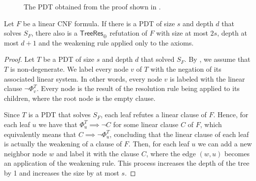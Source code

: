 \begin{figure}[H]
    \centering


    \caption{The PDT obtained from the proof shown in .}
    \label{pdt_cnf}
\end{figure}

\begin{lemma}
    \label{pdt_to_resp}
 Let $F$ be a linear CNF formula. If there is a PDT of size $s$ and depth $d$ that solves $S_F$, there also is a $\mathsf{TreeRes}_\oplus$ refutation of $F$ with size at most $2s$, depth at most $d+1$ and the weakening rule applied only to the axioms.
\end{lemma}

\begin{proof}
 Let $T$ be a PDT of size $s$ and depth $d$ that solved $S_F$. By , we assume that $T$ is non-degenerate. We label every node $v$ of $T$ with the negation of its associated linear system. In other words, every node $v$ is labeled with the linear clause $\lnot \Phi_v^T$. Every node is the result of the resolution rule being applied to its children, where the root node is the empty clause.

 Since $T$ is a PDT that solves $S_F$, each leaf refutes a linear clause of $F$. Hence, for each leaf $u$ we have that $\Phi_{u}^T \implies \lnot C$ for some linear clause $C$ of $F$, which equivalently means that $C \implies \lnot \Phi_u^T$, concluding that the linear clause of each leaf is actually the weakening of a clause of $F$. Then, for each leaf $u$ we can add a new neighbor node $w$ and label it with the clause $C$, where the edge $(w,u)$ becomes an application of the weakening rule. This process increases the depth of the tree by 1 and increases the size by at most $s$.
\end{proof}

